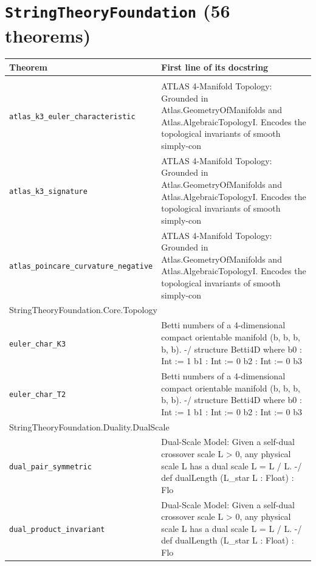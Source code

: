 \section*{\texttt{StringTheoryFoundation} (56 theorems)}
\begin{longtable}{p{}p{}}\toprule Theorem & First line of its docstring \\ \midrule\endhead\bottomrule\endfoot
\multicolumn{2}{l}{\textsf{\small StringTheoryFoundation.Atlas.AtlasGeometryBridge}} \\
\quad\texttt{\footnotesize atlas\_k3\_euler\_characteristic} & {\footnotesize ATLAS 4-Manifold Topology: Grounded in Atlas.GeometryOfManifolds and Atlas.AlgebraicTopologyI. Encodes the topological invariants of smooth simply-con} \\
\quad\texttt{\footnotesize atlas\_k3\_signature} & {\footnotesize ATLAS 4-Manifold Topology: Grounded in Atlas.GeometryOfManifolds and Atlas.AlgebraicTopologyI. Encodes the topological invariants of smooth simply-con} \\
\quad\texttt{\footnotesize atlas\_poincare\_curvature\_negative} & {\footnotesize ATLAS 4-Manifold Topology: Grounded in Atlas.GeometryOfManifolds and Atlas.AlgebraicTopologyI. Encodes the topological invariants of smooth simply-con} \\
\multicolumn{2}{l}{\textsf{\small StringTheoryFoundation.Core.Topology}} \\
\quad\texttt{\footnotesize euler\_char\_K3} & {\footnotesize Betti numbers of a 4-dimensional compact orientable manifold (b, b, b, b, b). -/ structure Betti4D where b0 : Int := 1 b1 : Int := 0 b2 : Int := 0 b3 } \\
\quad\texttt{\footnotesize euler\_char\_T2} & {\footnotesize Betti numbers of a 4-dimensional compact orientable manifold (b, b, b, b, b). -/ structure Betti4D where b0 : Int := 1 b1 : Int := 0 b2 : Int := 0 b3 } \\
\multicolumn{2}{l}{\textsf{\small StringTheoryFoundation.Duality.DualScale}} \\
\quad\texttt{\footnotesize dual\_pair\_symmetric} & {\footnotesize Dual-Scale Model: Given a self-dual crossover scale L > 0, any physical scale L has a dual scale L = L / L. -/ def dualLength (L\_star L : Float) : Flo} \\
\quad\texttt{\footnotesize dual\_product\_invariant} & {\footnotesize Dual-Scale Model: Given a self-dual crossover scale L > 0, any physical scale L has a dual scale L = L / L. -/ def dualLength (L\_star L : Float) : Flo} \\

\end{longtable}
